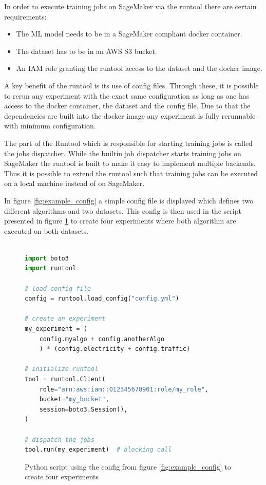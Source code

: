In order to execute training jobs on SageMaker via the runtool there are certain requirements:
\begin{itemize}
    \item The ML model needs to be in a SageMaker compliant docker container.
    \item The dataset has to be in an AWS S3 bucket.
    \item An IAM role granting the runtool access to the dataset and the docker image.
\end{itemize}

A key benefit of the runtool is its use of config files. Through these, it is possible to rerun any experiment with the exact same configuration as long as one has access to the docker container, the dataset and the config file. Due to that the dependencies are built into the docker image any experiment is fully rerunnable with minimum configuration.

The part of the Runtool which is responsible for starting training jobs is called the jobs dispatcher. While the builtin job dispatcher starts training jobs on SageMaker the runtool is built to make it easy to implement multiple backends. Thus it is possible to extend the runtool such that training jobs can be executed on a local machine instead of on SageMaker.

In figure \ref{fig:example_config} a simple config file is displayed which defines two different algorithms and two datasets. This config is then used in the script presented in figure \ref{fig:example_script}  to create four experiments where both algorithm are executed on both datasets.

\begin{figure}[h]
    \begin{lstlisting}[language=Python]

import boto3
import runtool

# load config file
config = runtool.load_config("config.yml")

# create an experiment
my_experiment = (
    config.myalgo + config.anotherAlgo
    ) * (config.electricity + config.traffic)

# initialize runtool
tool = runtool.Client(
    role="arn:aws:iam::012345678901:role/my_role",
    bucket="my_bucket",
    session=boto3.Session(),
)

# dispatch the jobs
tool.run(my_experiment)  # blocking call

\end{lstlisting}
    \caption{Python script using the config from figure \ref{fig:example_config} to create four experiments}
    \label{fig:example_script}
\end{figure}
\clearpage


